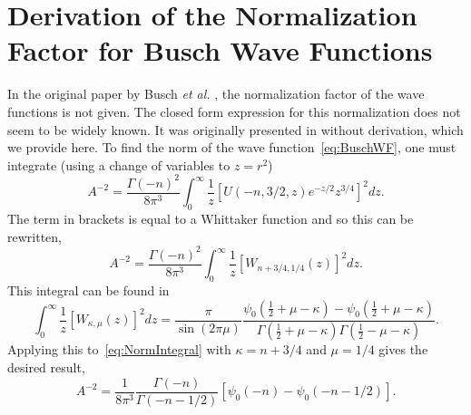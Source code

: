 \chapter{Derivation of the Normalization Factor for Busch Wave Functions}
In the original paper by Busch \textit{et al.} \cite{Busch}, the normalization factor of the wave functions is not given. The closed form expression for this normalization does not seem to be widely known. It was originally presented in \cite{PhysRevA.85.053614} without derivation, which we provide here. To find the norm of the wave function~\eqref{eq:BuschWF}, one must integrate (using a change of variables to $z=r^2$)
\begin{equation}\label{eq:NormIntegral}
A^{-2}=\frac{\Gamma(-n)^2}{8\pi^3}  \int_0^\infty \frac{1}{z}\left[U(-n,3/2,z)e^{-z/2} z^{3/4} \right]^2  dz.
\end{equation}
The term in brackets is equal to a Whittaker function \cite{DLMF} and so this can be rewritten,
\begin{equation}
A^{-2}=\frac{\Gamma(-n)^2}{8\pi^3}  \int_0^\infty \frac{1}{z}\left[W_{n+3/4,1/4}(z) \right]^2  dz.
\end{equation}
This integral can be found in \cite{GradshteynRyzhik}
\begin{equation}
\int_0^\infty \frac{1}{z}\left[W_{\kappa,\mu}(z) \right]^2  dz=\frac{\pi}{\sin (2\pi \mu)}\frac{\psi_0(\frac{1}{2}+\mu-\kappa)-\psi_0(\frac{1}{2}+\mu-\kappa)}{\Gamma(\frac{1}{2}+\mu-\kappa)\Gamma(\frac{1}{2}-\mu-\kappa)}.
\end{equation}
Applying this to~\eqref{eq:NormIntegral} with $\kappa=n+3/4$ and $\mu=1/4$ gives the desired result,
\begin{equation}
A^{-2}=\frac{1}{8\pi^3}  \frac{\Gamma (-n)}{\Gamma(-n-1/2)}\left[\psi_0(-n)-\psi_0(-n-1/2)\right].
\end{equation}